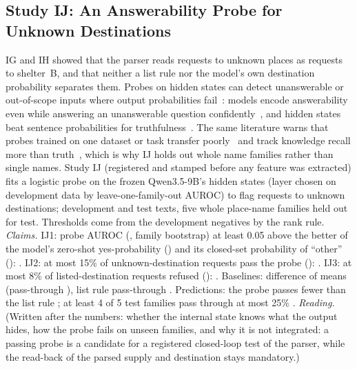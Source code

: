 \subsection{Study IJ: An Answerability Probe for Unknown Destinations}\label{sec:moved-ij}
IG and IH showed that the parser reads requests to unknown places as requests to shelter~B, and that neither a list rule nor the model's own destination probability separates them. Probes on hidden states can detect unanswerable or out-of-scope inputs where output probabilities fail~\cite{wagner2026twoaxes,lavi2025linear}: models encode answerability even while answering an unanswerable question confidently~\cite{slobodkin2023unanswerability}, and hidden states beat sentence probabilities for truthfulness~\cite{azaria2023lying,marks2023geometry}. The same literature warns that probes trained on one dataset or task transfer poorly~\cite{orgad2025knowmore,azizian2025orthogonal} and track knowledge recall more than truth~\cite{cheang2025recall}, which is why IJ holds out whole name families rather than single names. Study IJ (registered and stamped before any feature was extracted) fits a logistic probe on the frozen Qwen3.5-9B's hidden states (layer \IJLayer{} chosen on development data by leave-one-family-out AUROC) to flag requests to unknown destinations; \IJDev{} development and \IJTest{} test texts, five whole place-name families held out for test. Thresholds come from the development negatives by the rank rule.
\emph{Claims.} IJ1: probe AUROC \IJProbeAuroc{} (\IJProbeAurocCI, family bootstrap) at least 0.05 above the better of the model's zero-shot yes-probability (\IJZeroShotAuroc) and its closed-set probability of ``other'' (\IJPOtherAuroc): \IJOneHolds. IJ2: at most 15\% of unknown-destination requests pass the probe (\IJProbePass): \IJTwoHolds. IJ3: at most 8\% of listed-destination requests refused (\IJProbeFalseRef): \IJThreeHolds. Baselines: difference of means \IJDiffMeansAuroc{} (pass-through \IJDiffMeansPass), list rule pass-through \IJListRulePass. Predictions: the probe passes fewer than the list rule \IJPredOneHolds; at least 4 of 5 test families pass through at most 25\% \IJPredTwoHolds.
\emph{Reading.} (Written after the numbers: whether the internal state knows what the output hides, how the probe fails on unseen families, and why it is not integrated: a passing probe is a candidate for a registered closed-loop test of the parser, while the read-back of the parsed supply and destination stays mandatory.)
